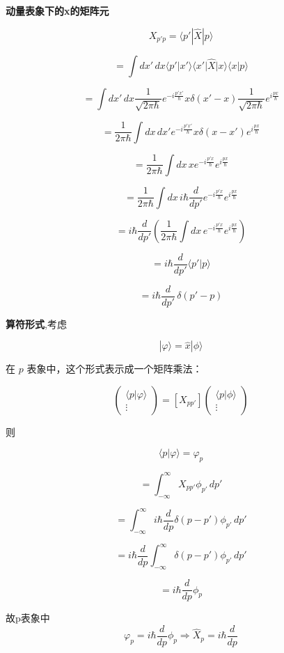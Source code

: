 \documentclass[lang=cn,10pt]{elegantbook}
\begin{document}
\textbf{动量表象下的x的矩阵元}

\[
	X_{p'p} = \langle p' | \hat{X} | p \rangle
\]

\[
	= \int dx' \, dx \langle p' | x' \rangle \langle x' | \hat{X} | x \rangle \langle x | p \rangle
\]

\[
	= \int dx' \, dx \frac{1}{\sqrt{2\pi \hbar}} e^{-i \frac{p' x'}{\hbar}} x \delta(x'-x) \frac{1}{\sqrt{2\pi \hbar}} e^{i \frac{p x}{\hbar}}
\]

\[
	= \frac{1}{2\pi \hbar} \int dx \, dx' e^{-i \frac{p' x'}{\hbar}} x \delta(x - x') e^{i \frac{p x}{\hbar}}
\]

\[
	= \frac{1}{2\pi \hbar} \int dx \, x e^{-i \frac{p' x}{\hbar}} e^{i \frac{p x}{\hbar}}
\]

\[
	= \frac{1}{2\pi \hbar} \int dx \, i\hbar \frac{d}{dp'} e^{-i \frac{p' x}{\hbar}} e^{i \frac{p x}{\hbar}}
\]

\[
	= i\hbar \frac{d}{dp'} \left( \frac{1}{2\pi \hbar} \int dx \, e^{-i \frac{p' x}{\hbar}} e^{i \frac{p x}{\hbar}} \right)
\]

\[
	= i\hbar \frac{d}{dp'} \langle p' | p \rangle
\]

\[
= i \hbar \frac{d}{dp'}  \, \delta( p' - p)
\]

\textbf{算符形式},考虑

\[
	| \varphi \rangle = \hat{x} | \phi \rangle
\]

	在 $p$ 表象中，这个形式表示成一个矩阵乘法：

\[
\begin{pmatrix}
		\langle p | \varphi \rangle \\
	\vdots
\end{pmatrix} = [X_{pp'}]
\begin{pmatrix}
	\langle p | \phi \rangle \\
	\vdots
\end{pmatrix}
\]

则 

\[
	\langle p | \varphi \rangle = \varphi_p
\]

\[
	= \int_{-\infty}^{\infty} X_{pp'} \phi_{p'} \, dp'
\]

\[
	= \int_{-\infty}^{\infty} i \hbar \frac{d}{dp} \delta(p - p') \phi_{p'} \, dp'
\]

\[
	= i \hbar \frac{d}{dp}\int_{-\infty}^{\infty} \delta(p - p') \phi_{p'} \, dp'
\]

\[
	= i\hbar\frac{d}{dp}\phi_p
\]

故p表象中
\begin{equation*}
		\varphi_p=i\hbar\frac{d}{dp}\phi_p\Rightarrow \hat{X}_p=i\hbar\frac{d}{dp}
\end{equation*}
\end{document}
